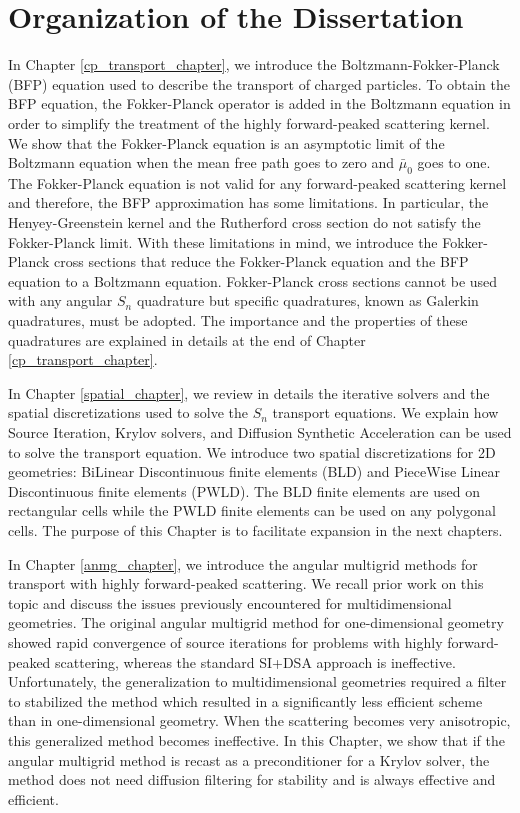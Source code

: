 \section{Organization of the Dissertation}
\noindent In Chapter \ref{cp_transport_chapter}, we introduce the 
Boltzmann-Fokker-Planck (BFP) equation used to describe the transport of
charged particles. To obtain the BFP equation, the Fokker-Planck operator is
added in the Boltzmann equation in order to simplify the treatment of the
highly forward-peaked scattering kernel. We show that the Fokker-Planck
equation is an asymptotic limit of the Boltzmann equation when the mean free
path goes to zero and $\bar{\mu}_0$ goes to one. The Fokker-Planck equation is
not valid for any forward-peaked scattering kernel and therefore, the BFP
approximation has some limitations. In particular, the Henyey-Greenstein
kernel and the Rutherford cross section do not satisfy the Fokker-Planck
limit. With these limitations in mind, we introduce the Fokker-Planck cross
sections that reduce the Fokker-Planck equation and the BFP equation
to a Boltzmann equation. Fokker-Planck cross sections cannot be used with any
angular $S_n$ quadrature but specific quadratures, known as Galerkin
quadratures, must be adopted. The importance and the properties of these
quadratures are explained in details at the end of Chapter
\ref{cp_transport_chapter}.

In Chapter \ref{spatial_chapter}, we review in details the iterative
solvers and the spatial discretizations used to solve the $S_n$ transport 
equations. We explain how Source Iteration, Krylov solvers, and Diffusion 
Synthetic Acceleration can be used to solve the transport equation.
We introduce two spatial discretizations for 2D geometries: BiLinear 
Discontinuous finite elements (BLD) and PieceWise 
Linear Discontinuous finite elements (PWLD). The BLD finite elements are used 
on rectangular cells while the PWLD finite elements can be used on any polygonal 
cells. The purpose of this Chapter is to facilitate expansion in the next
chapters.

In Chapter \ref{anmg_chapter}, we introduce the angular multigrid 
methods for transport with highly forward-peaked scattering. We recall  
prior work on this topic and discuss the issues previously encountered for 
multidimensional geometries. The original angular multigrid method for 
one-dimensional geometry showed rapid convergence of source iterations for 
problems with highly forward-peaked scattering, whereas the standard SI+DSA
approach is ineffective. Unfortunately, the 
generalization to multidimensional geometries required a filter to stabilized 
the method which resulted in a significantly less efficient scheme than in 
one-dimensional geometry. When 
the scattering becomes very anisotropic, this generalized method becomes
ineffective. In this Chapter, we show that if the angular multigrid method is 
recast as a preconditioner for a Krylov solver, the method does not need 
diffusion filtering for stability and is always effective and efficient.

